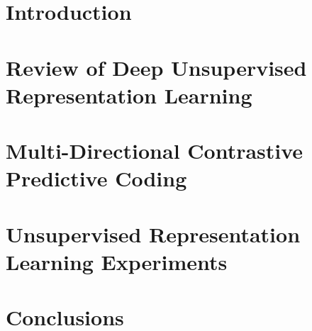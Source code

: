 \section{Introduction}



\section{Review of Deep Unsupervised Representation Learning}



\section{Multi-Directional Contrastive Predictive Coding}



\section{Unsupervised Representation Learning Experiments}



\section{Conclusions}